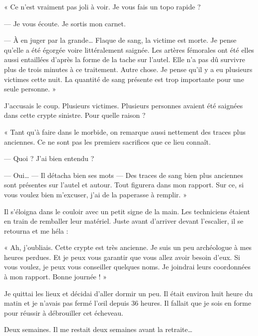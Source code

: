 « Ce n'est vraiment pas joli à voir. Je vous fais un topo rapide ?

— Je vous écoute. Je sortis mon carnet.

— À en juger par la grande… Flaque de sang, la victime est morte. Je pense qu'elle a été égorgée voire littéralement 
saignée. Les artères fémorales ont été elles aussi entaillées d'après la forme de la tache sur l'autel. Elle n'a pas dû 
survivre plus de trois minutes à ce traitement. Autre chose. Je pense qu'il y a eu plusieurs victimes cette nuit. La 
quantité de sang présente est trop importante pour une seule personne. »

J'accusais le coup. Plusieurs victimes. Plusieurs personnes avaient été saignées dans cette crypte sinistre. Pour 
quelle raison ?

« Tant qu'à faire dans le morbide, on remarque aussi nettement des traces plus anciennes. Ce ne sont pas les premiers 
sacrifices que ce lieu connaît.

— Quoi ? J'ai bien entendu ?

— Oui… — Il détacha bien ses mots — Des traces de sang bien plus anciennes sont présentes sur l'autel et autour. Tout 
figurera dans mon rapport. Sur ce, si vous voulez bien m'excuser, j'ai de la paperasse à remplir. »

Il s'éloigna dans le couloir avec un petit signe de la main. Les techniciens étaient en train de remballer leur 
matériel. Juste avant d'arriver devant l'escalier, il se retourna et me héla :

« Ah, j'oubliais. Cette crypte est très ancienne. Je suis un peu archéologue à mes heures perdues. Et je peux vous 
garantir que vous allez avoir besoin d'eux. Si vous voulez, je peux vous conseiller quelques noms. Je joindrai leurs 
coordonnées à mon rapport. Bonne journée ! »

Je quittai les lieux et décidai d'aller dormir un peu. Il était environ huit heure du matin et je n'avais pas fermé 
l'œil depuis 36 heures. Il fallait que je sois en forme pour réussir à débrouiller cet écheveau.

Deux semaines. Il me restait deux semaines avant la retraite…
